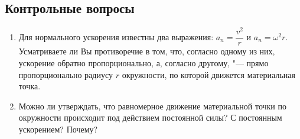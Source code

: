 \documentclass[a4paper, 12pt]{extarticle}
\begin{document}
\subsection{Контрольные вопросы}
\begin{enumerate}
\item Для нормального ускорения известны два выражения: $a_n = \dfrac{v^2}{r}$ и $a_n = \omega^2 r$. Усматриваете ли Вы противоречие в том, что, согласно одному из них, ускорение обратно пропорционально, а, согласно другому, "--- прямо пропорционально радиусу $r$ окружности, по которой движется материальная точка. %
\item Можно ли утверждать, что равномерное движение материальной точки по окружности происходит под действием постоянной силы? С постоянным ускорением? Почему?
\end{enumerate}
\end{document}
